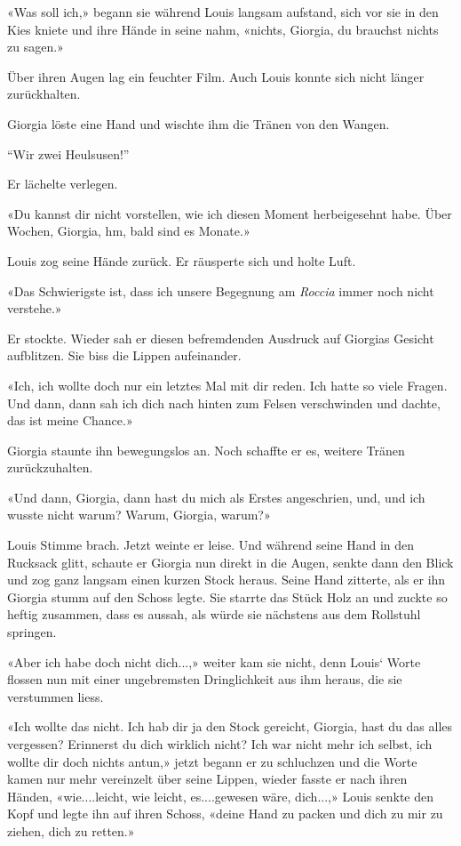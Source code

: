 «Was soll ich,» begann sie während Louis langsam aufstand, sich vor sie
in den Kies kniete und ihre Hände in seine nahm, «nichts, Giorgia, du
brauchst nichts zu sagen.»

Über ihren Augen lag ein feuchter Film. Auch Louis konnte sich nicht
länger zurückhalten.

Giorgia löste eine Hand und wischte ihm die Tränen von den Wangen.

``Wir zwei Heulsusen!''

Er lächelte verlegen.

«Du kannst dir nicht vorstellen, wie ich diesen Moment herbeigesehnt
habe. Über Wochen, Giorgia, hm, bald sind es Monate.»

Louis zog seine Hände zurück. Er räusperte sich und holte Luft.

«Das Schwierigste ist, dass ich unsere Begegnung am \emph{Roccia} immer
noch nicht verstehe.»

Er stockte. Wieder sah er diesen befremdenden Ausdruck auf Giorgias
Gesicht aufblitzen. Sie biss die Lippen aufeinander.

«Ich, ich wollte doch nur ein letztes Mal mit dir reden. Ich hatte so
viele Fragen. Und dann, dann sah ich dich nach hinten zum Felsen
verschwinden und dachte, das ist meine Chance.»

Giorgia staunte ihn bewegungslos an. Noch schaffte er es, weitere Tränen
zurückzuhalten.

«Und dann, Giorgia, dann hast du mich als Erstes angeschrien, und, und
ich wusste nicht warum? Warum, Giorgia, warum?»

Louis Stimme brach. Jetzt weinte er leise. Und während seine Hand in den
Rucksack glitt, schaute er Giorgia nun direkt in die Augen, senkte dann
den Blick und zog ganz langsam einen kurzen Stock heraus. Seine Hand
zitterte, als er ihn Giorgia stumm auf den Schoss legte. Sie starrte das
Stück Holz an und zuckte so heftig zusammen, dass es aussah, als würde
sie nächstens aus dem Rollstuhl springen.

«Aber ich habe doch nicht dich...,» weiter kam sie nicht, denn Louis`
Worte flossen nun mit einer ungebremsten Dringlichkeit aus ihm heraus,
die sie verstummen liess.

«Ich wollte das nicht. Ich hab dir ja den Stock gereicht, Giorgia, hast
du das alles vergessen? Erinnerst du dich wirklich nicht? Ich war nicht
mehr ich selbst, ich wollte dir doch nichts antun,» jetzt begann er zu
schluchzen und die Worte kamen nur mehr vereinzelt über seine Lippen,
wieder fasste er nach ihren Händen, «wie....leicht, wie leicht,
es....gewesen wäre, dich...,» Louis senkte den Kopf und legte ihn auf
ihren Schoss, «deine Hand zu packen und dich zu mir zu ziehen, dich zu
retten.»

